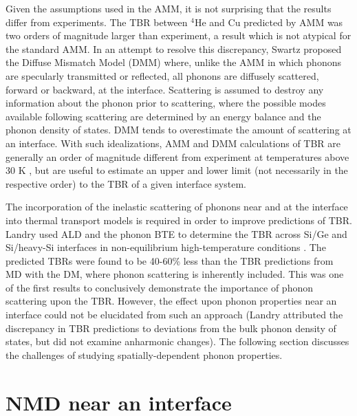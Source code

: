 Given the assumptions used in the AMM, it is not surprising that the results differ from experiments. The TBR between $^4$He and Cu predicted by AMM was two orders of magnitude larger than experiment, a result which is not atypical for the standard AMM. In an attempt to resolve this discrepancy, Swartz proposed the Diffuse Mismatch Model (DMM) \cite{swartz1987thermal} where, unlike the AMM in which phonons are specularly transmitted or reflected, all phonons are diffusely scattered, forward or backward, at the interface. Scattering is assumed to destroy any information about the phonon prior to scattering, where the possible modes available following scattering are determined by an energy balance and the phonon density of states. DMM tends to overestimate the amount of scattering at an interface. With such idealizations, AMM and DMM calculations of TBR are generally an order of magnitude different from experiment at temperatures above 30 K \cite{landrythesis}, but are useful to estimate an upper and lower limit (not necessarily in the respective order) to the TBR of a given interface system.

The incorporation of the inelastic scattering of phonons near and at the interface  into thermal transport models is required in order to improve predictions of TBR. Landry used ALD and the phonon BTE to determine the TBR across Si/Ge and Si/heavy-Si interfaces in non-equilibrium high-temperature conditions \cite{landrythesis}. The predicted TBRs were found to be 40-60\% less than the TBR predictions from MD with the DM, where phonon scattering is inherently included. This was one of the first results to conclusively demonstrate the importance of phonon scattering upon the TBR. However, the effect upon phonon properties near an interface could not be elucidated from such an approach (Landry attributed the discrepancy in TBR predictions to deviations from the bulk phonon density of states, but did not examine anharmonic changes). The following section discusses the challenges of studying spatially-dependent phonon properties.

\section{NMD near an interface}

